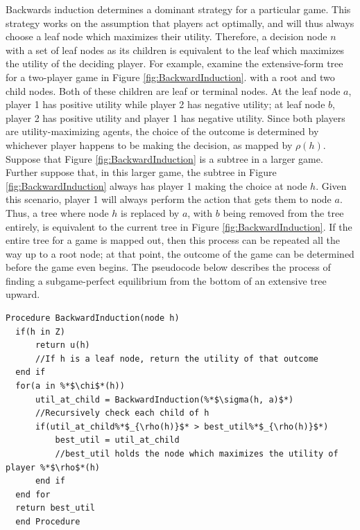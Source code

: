 Backwards induction determines a dominant strategy for a particular game. This strategy works on the assumption that players act optimally, and will thus always choose a leaf node which maximizes their utility. Therefore, a decision node $n$ with a set of leaf nodes as its children is equivalent to the leaf which maximizes the utility of the deciding player. For example, examine the extensive-form tree for a two-player game in Figure \ref{fig:BackwardInduction}. with a root and two child nodes. Both of these children are leaf or terminal nodes. At the leaf node $a$, player 1 has positive utility while player 2 has negative utility; at leaf node $b$, player 2 has positive utility and player 1 has negative utility. Since both players are utility-maximizing agents, the choice of the outcome is determined by whichever player happens to be making the decision, as mapped by $\rho(h)$. Suppose that Figure \ref{fig:BackwardInduction} is a subtree in a larger game. Further suppose that, in this larger game, the subtree in Figure \ref{fig:BackwardInduction} always has player 1 making the choice at node $h$. Given this scenario, player 1 will always perform the action that gets them to node $a$. Thus, a tree where node $h$ is replaced by $a$, with $b$ being removed from the tree entirely, is equivalent to the current tree in Figure \ref{fig:BackwardInduction}. If the entire tree for a game is mapped out, then this process can be repeated all the way up to a root node; at that point, the outcome of the game can be determined before the game even begins. The pseudocode below describes the process of finding a subgame-perfect equilibrium from the bottom of an extensive tree upward.\\

\begin{lstlisting}[language=pseudocode]
  Procedure BackwardInduction(node h)
  if(h in Z)
      return u(h)
      //If h is a leaf node, return the utility of that outcome
  end if
  for(a in %*$\chi$*(h))
      util_at_child = BackwardInduction(%*$\sigma(h, a)$*)
      //Recursively check each child of h
      if(util_at_child%*$_{\rho(h)}$* > best_util%*$_{\rho(h)}$*)
          best_util = util_at_child
          //best_util holds the node which maximizes the utility of player %*$\rho$*(h)
      end if
  end for
  return best_util
  end Procedure
\end{lstlisting}

